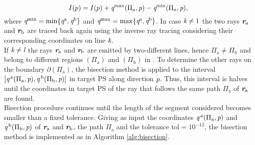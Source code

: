 \begin{equation}
I(p) = I(p)+\textit{q}^{\textrm{max}}(\Pi_\textrm{a}, \textit{p})-\textit{q}^{\textrm{min}}(\Pi_\textrm{a}, \textit{p}),
\end{equation}
where $\textit{q}^{\textrm{min}} = \min\{\textit{q}^{\textrm{a}}, \textit{q}^{\textrm{b}}\}$ and $\textit{q}^{\textrm{max}} = \max\{\textit{q}^{\textrm{a}}, \textit{q}^{\textrm{b}}\}$. In case $\textit{k}\neq1$ the two rays $\textit{\textbf{r}}_{\textrm{a}}$ and $\textit{\textbf{r}}_{\textrm{b}}$ are traced back again using the inverse ray tracing considering their corresponding coordinates on line $\textit{k}$.
\\ \indent If $\textit{k}\neq \textit{l}$ the rays $\textit{\textbf{r}}_\textrm{a}$ and $\textit{\textbf{r}}_\textrm{b}$ are emitted by two-different lines, hence $\Pi_{\textrm{a}}\neq \Pi_{\textrm{b}}$ and belong to different regions $(\Pi_{\textrm{a}})$ and $(\Pi_{\textrm{b}})$ in . To determine the other rays on the boundary $\partial$$(\Pi_{\textrm{a}})$, the bisection method is applied to the interval $[\textit{q}^{\,\textrm{a}}(\Pi_{\textrm{a}}, \textit{p}), \textit{q}^{\,\textrm{b}}(\Pi_{\textrm{b}}, \textit{p})]$ in target PS  along direction $\textit{p}$. Thus, this interval is halves until the coordinates in target PS of the ray that follows the same path $\Pi_{\textrm{a}}$ of $\textit{\textbf{r}}_{\textrm{a}}$ are found. \\ \indent Bisection procedure continues until the length of the segment considered becomes smaller than a fixed tolerance. 
Giving as input the coordinates $\textit{q}^{\,\textrm{a}}(\Pi_{\textrm{a}}, \textit{p})$ and $\textit{q}^{\,\textrm{b}}(\Pi_{\textrm{b}}, \textit{p})$ of $\textit{\textbf{r}}_{\textrm{a}}$ and $\textit{\textbf{r}}_{\textrm{b}}$, the path $\Pi_\textrm{a}$ and the tolerance $\textrm{tol}= 10^{-12}$, the bisection method is implemented as in Algorithm \ref{alg:bisection}.
